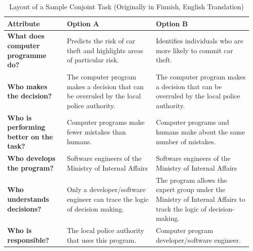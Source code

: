 \begin{table}[ht]
\centering
\renewcommand{\arraystretch}{1.3} %
\begin{tabular}{|p{5cm}|p{5.5cm}|p{5.5cm}|}
\hline
\cellcolor[gray]{0.8}\textbf{Attribute} & \cellcolor[gray]{0.8}\textbf{Option A} & \cellcolor[gray]{0.8}\textbf{Option B} \\ 
\hline
\cellcolor[gray]{0.9}\textbf{What does computer programme do?} 
& Predicts the risk of car theft and highlights areas of particular risk. 
& Identifies individuals who are more likely to commit car theft.   \\ 
\hline
\cellcolor[gray]{0.9}\textbf{Who makes the decision?} 
& The computer program makes a decision that can be overruled by the local police authority.
& The computer program makes a decision that can be overruled by the local police authority. \\ 
\hline
\cellcolor[gray]{0.9}\textbf{Who is performing better on the task?} 
& Computer programs make fewer mistakes than humans.   
& Computer programs and humans make about the same number of mistakes.  \\ 
\hline
\cellcolor[gray]{0.9}\textbf{Who develops the program?} 
& Software engineers of the Ministry of Internal Affairs 
& Software engineers of the Ministry of Internal Affairs  \\ 
\hline
\cellcolor[gray]{0.9}\textbf{Who understands decisions?} 
& Only a developer/software engineer can trace the logic of decision making. 
& The program allows the expert group under the Ministry of Internal Affairs to track the logic of decision-making. \\ 
\hline
\cellcolor[gray]{0.9}\textbf{Who is responsible?} 
& The local police authority that uses this program. 
& Computer program developer/software engineer.     \\ 
\hline
\end{tabular}
\caption{Layout of a Sample Conjoint Task (Originally in Finnish, English Translation)}
\label{tab:conjoint-task-layout3}
\end{table}
\flushleft
\normalsize